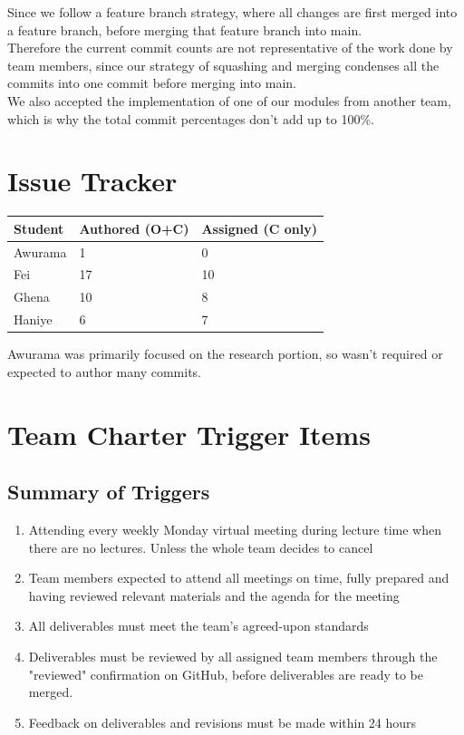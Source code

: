 \documentclass{article}
\begin{document}
Since we follow a feature branch strategy, where all changes are first merged into a feature branch, before merging that feature branch into main. \\
Therefore the current commit counts are not representative of the work done by team members, since our strategy of squashing and merging condenses all the commits into one commit before merging into main. \\

We also accepted the implementation of one of our modules from another team, which is why the total commit percentages don't add up to 100\%.
\section{Issue Tracker}

\begin{table}[H]
\centering
\begin{tabular}{lll}
\toprule
\textbf{Student} & \textbf{Authored (O+C)} & \textbf{Assigned (C only)}\\
\midrule
Awurama & 1 & 0 \\
Fei & 17 & 10 \\
Ghena & 10 & 8\\
Haniye & 6 & 7\\
\bottomrule
\end{tabular}
\end{table}

Awurama was primarily focused on the research portion, so wasn't required or expected to author many commits.

\section{Team Charter Trigger Items}
\subsection{Summary of Triggers}
\begin{enumerate}
\item{Attending every weekly Monday virtual meeting during lecture time when there are no lectures. Unless the whole team decides to cancel}
\item{Team members expected to attend all meetings on time, fully prepared and having reviewed relevant materials and the agenda for the meeting}
\item{All deliverables must meet the team's agreed-upon standards}
\item{Deliverables must be reviewed by all assigned team members through the "reviewed" confirmation on GitHub, before deliverables are ready to be merged.}
\item{Feedback on deliverables and revisions must be made within 24 hours}
\end{enumerate}
\end{document}
